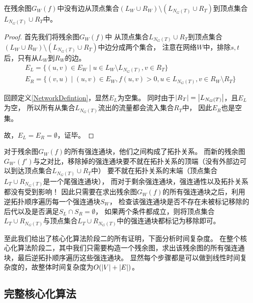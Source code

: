 \begin{claim} \label{residualgraph4}
在残余图$G_W(f)$中没有边从顶点集合$(L_W \cup R_W) \setminus (L_{N_G(T)} \cup R_T)$到顶点集合$L_{N_G(T)} \cup R_T$中。
\end{claim}
\begin{proof}
首先我们将残余图$G_W(f)$中
从顶点集合$L_{N_G(T)} \cup R_T$到顶点集合$(L_W \cup R_W) \setminus (L_{N_G(T)} \cup R_T)$中边分成两个集合，
注意在网络$W$中，排除$s, t$后，只有从$L_W$到$R_W$的边。
  \begin{equation*} \begin{aligned}
    & E_L = \{(u, v) \in E_W\;|\;u \in L_W \setminus L_{N_G(T)},v \in R_T\} \\
    & E_R = \{(v, u)\;|\;(u, v) \in E_W,f(u, v) > 0,u \in L_{N_G(T)},v \in R_W \setminus R_T\}
  \end{aligned} \end{equation*}

回顾定义\ref{NetworkDefintion}，显然$E_L$为空集。
同时由于$\left\vert R_T \right\vert = \left\vert L_{N_G(T)} \right\vert$，且$E_L$为空，
所以所有从集合$L_{N_G(T)}$流出的流量都会流入集合$R_T$中，
因此$E_R$也是空集。

故，$E_L = E_R = \emptyset$，证毕。
\end{proof}



对于残余图$G_W(f)$的所有强连通块，他们之间构成了拓扑关系。
而新的残余图$G_{W'}(f')$与之对比，移除掉的强连通块要不就在拓扑关系的顶端（没有外部边可以到达顶点集合$L_{N_G(T)} \cup R_T$中）
要不就在拓扑关系的末端（顶点集合$L_T \cup R_{N_G(T)}$是一个尾强连通块），
而对于剩余强连通块，强连通性以及拓扑关系都没有受到影响！
因此只需要在求出残余图$G_W(f)$的所有强连通块之后，利用逆拓扑顺序遍历每一个强连通块$S_W$，
检查该强连通块是否不存在未被标记移除的后代以及是否满足$S_L \cap S_R = \emptyset$，
如果两个条件都成立，则将顶点集合$L_T \cup R_{N_G(T)}$与顶点集合$L_T \cup R_{N_G(T)}$中的强连通块都标记为移除即可。

 
至此我们给出了核心化算法阶段二的所有证明，下面分析时间复杂度。
在整个核心化算法阶段二，其中我们只需要构造一个残余图，求出该残余图的所有强连通块，最后逆拓扑顺序遍历这些强连通块。
显然每个步骤都是可以做到线性时间复杂度的，故整体时间复杂度为$O(\left\vert V \right\vert + \left\vert E \right\vert)$。

\subsection{完整核心化算法}

